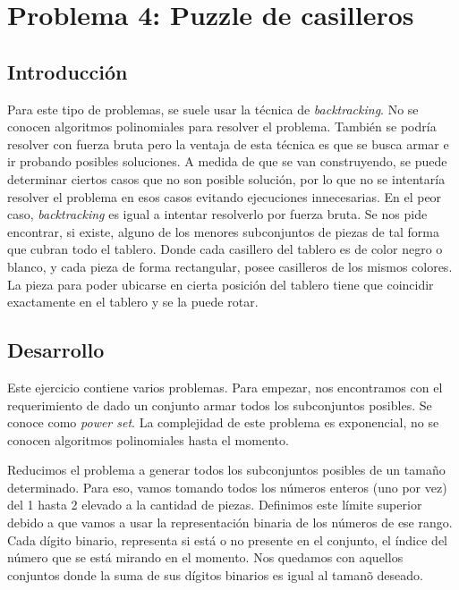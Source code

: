 \section{Problema 4: Puzzle de casilleros}

\subsection{Introducci\'on}

\quad Para este tipo de problemas, se suele usar la t\'ecnica de \textit{backtracking}. No se conocen algoritmos polinomiales para resolver el problema. Tambi\'en se podr\'ia resolver con fuerza bruta pero la ventaja de esta t\'ecnica es que se busca armar e ir probando posibles soluciones. A medida de que se van construyendo, se puede determinar ciertos casos que no son posible soluci\'on, por lo que no se intentar\'ia resolver el problema en esos casos evitando ejecuciones innecesarias. En el peor caso, \textit{backtracking} es igual a intentar resolverlo por fuerza bruta.
\quad Se nos pide encontrar, si existe, alguno de los menores subconjuntos de piezas de tal forma que cubran todo el tablero. Donde cada casillero del tablero es de color negro o blanco, y cada pieza de forma rectangular, posee casilleros de los mismos colores. La pieza para poder ubicarse en cierta posici\'on del tablero tiene que coincidir exactamente en el tablero y se la puede rotar. 

\subsection{Desarrollo}

\quad Este ejercicio contiene varios problemas. Para empezar, nos encontramos con el requerimiento de dado un conjunto armar todos los subconjuntos posibles. Se conoce como \textit{power set}. La complejidad de este problema es exponencial, no se conocen algoritmos polinomiales hasta el momento.

\quad Reducimos el problema a generar todos los subconjuntos posibles de un tama\~no determinado. Para eso, vamos tomando todos los n\'umeros enteros (uno por vez) del 1 hasta 2 elevado a la cantidad de piezas. Definimos este l\'imite superior debido a que vamos a usar la representaci\'on binaria de los n\'umeros de ese rango. Cada d\'igito binario, representa si est\'a o no presente en el conjunto, el \'indice del n\'umero que se est\'a mirando en el momento. Nos quedamos con aquellos conjuntos donde la suma de sus d\'igitos binarios es igual al taman\~o deseado.


